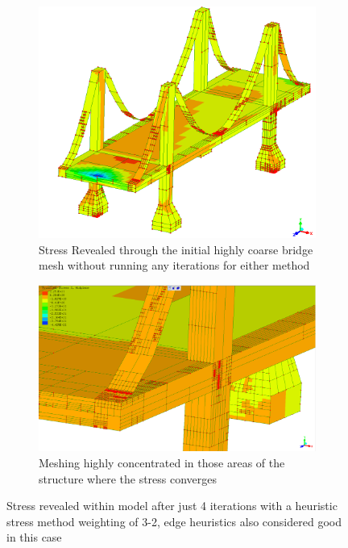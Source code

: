 \begin{figure}[H]
\centering
\begin{subfigure}{.5\textwidth}
  \centering
  \includegraphics[width=0.9\linewidth]{../Graphics/BridgeCrossLoadingStress/Hybrid-best-3-2.png}
  \caption{Stress Revealed through the initial highly coarse bridge mesh without running any iterations for either method}
  \label{fig:sub1}
\end{subfigure}%
\begin{subfigure}{.5\textwidth}
  \centering
  \includegraphics[width=0.9\linewidth]{../Graphics/BridgeCrossLoadingStress/BridgeCrossLoadingStress6-3-2.png}
  \caption{Meshing highly concentrated in those areas of the structure where the stress converges}
  \label{fig:sub2}
\end{subfigure}
\label{fig:test}
  \caption{Stress revealed within model after just 4 iterations with a heuristic stress method weighting of 3-2, edge heuristics also considered good in this case}
 \end{figure}



